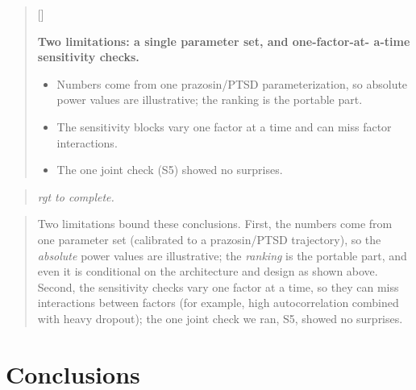 \documentclass[
  11pt,
]{article}
\newcounter{pgraph}
\newenvironment{bullets}{%
  \stepcounter{pgraph}%
  \begin{quote}\small\sffamily\color[gray]{0.30}%
  {\normalfont\scriptsize\color[gray]{0.58}[\thepgraph]\enspace}}{%
  \end{quote}}
\newenvironment{rgt}{%
  \begin{quote}\small\itshape\color[RGB]{20,60,160}}{%
  \end{quote}}
\newenvironment{orig}{%
  \begin{quote}\normalsize\color[gray]{0.55}}{%
  \end{quote}}
\begin{document}
\begin{bullets}

\textbf{Two limitations: a single parameter set, and one-factor-at-
a-time sensitivity checks.}

\begin{itemize}\setlength{\itemsep}{2pt}\setlength{\parskip}{0pt}
\item Numbers come from one prazosin/PTSD parameterization, so
absolute power values are illustrative; the ranking is the portable
part.
\item The sensitivity blocks vary one factor at a time and can miss
factor interactions.
\item The one joint check (S5) showed no surprises.
\end{itemize}

\end{bullets}

\begin{rgt}
rgt to complete.

\end{rgt}

\begin{orig}
Two limitations bound these conclusions. First, the numbers come
from one parameter set (calibrated to a prazosin/PTSD trajectory),
so the \emph{absolute} power values are illustrative; the \emph{ranking} is
the portable part, and even it is conditional on the architecture
and design as shown above. Second, the sensitivity checks vary one
factor at a time, so they can miss interactions between factors
(for example, high autocorrelation combined with heavy dropout);
the one joint check we ran, S5, showed no surprises.

\end{orig}

\section{Conclusions}\label{conclusions}
\end{document}
